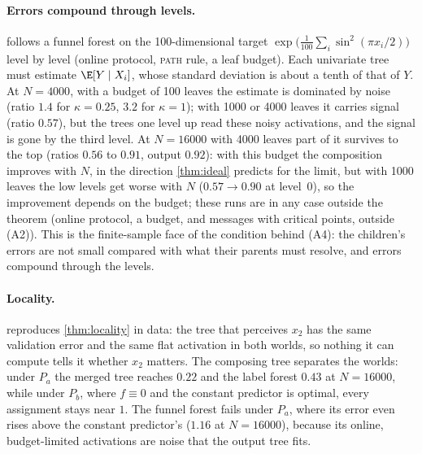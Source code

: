 \paragraph{Errors compound through levels.}   follows a funnel forest on the 100-dimensional target $\exp\bigl(\tfrac1{100}\sum_i\sin^2(\pi x_i/2)\bigr)$ level by level (online protocol, \textsc{path} rule, a leaf budget).  Each univariate tree must estimate
$\E[Y\mid X_i]$, whose standard deviation is about a tenth of that of $Y$.  At $N=4000$, with a budget
of 100 leaves the estimate is dominated by noise (ratio $1.4$ for $\kappa=0.25$, $3.2$ for
$\kappa=1$); with 1000 or 4000 leaves it carries signal (ratio $0.57$), but the trees one
level up read these noisy activations, and the signal is gone by the third level.  At $N=16000$ with 4000 leaves part of
it survives to the top (ratios $0.56$ to $0.91$, output $0.92$): with this budget the composition improves with $N$, in the direction \cref{thm:ideal}
predicts for the limit, but with 1000 leaves the low levels get worse with $N$ ($0.57\to0.90$
at level~0), so the improvement depends on the budget; these runs are in any case outside
the theorem (online protocol, a budget, and messages with critical points, outside (A2)).  This is the finite-sample face of the
condition behind (A4): the children's errors are not small compared with what their
parents must resolve, and errors compound through the levels.

\begin{table}[t]
\centering\small

\caption{The two sign worlds of \cref{thm:locality} (five seeds).  Left: a tree that
perceives $x_2$ and predicts $Y$---its validation RMSE equals that of the constant
predictor ($1.00$) and its activation is flat in both worlds.  Right: the composing
tree's test RMSE for four task assignments.}
\label{tab:locality}
\end{table}

\paragraph{Locality.}
 reproduces \cref{thm:locality} in data: the tree that perceives $x_2$
has the same validation error and the same flat activation in both worlds, so nothing
it can compute tells it whether $x_2$ matters.  The composing tree separates the worlds:
under $P_a$ the merged tree reaches $0.22$ and the label forest $0.43$ at $N=16000$, while
under $P_b$, where $f\equiv0$ and the constant predictor is optimal, every assignment
stays near $1$.  The funnel forest fails under $P_a$, where its error even rises above the constant predictor's ($1.16$ at $N=16000$), because
its online, budget-limited activations are noise that the output tree fits.

